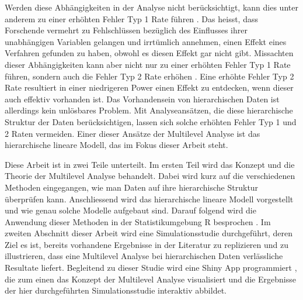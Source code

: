 \documentclass[12pt]{article}\usepackage[]{graphicx}\usepackage[]{color}
\begin{document}
Werden diese Abhängigkeiten in der Analyse nicht berücksichtigt, kann dies unter anderem zu einer erhöhten Fehler Typ 1 Rate führen \citep{dorman2008effect, mcneish2014analyzing}. Das heisst, dass Forschende vermehrt zu Fehlschlüssen bezüglich des Einflusses ihrer unabhängigen Variablen gelangen und irrtümlich annehmen, einen Effekt eines Verfahren gefunden zu haben, obwohl es diesen Effekt gar nicht gibt. Missachten dieser Abhängigkeiten kann aber nicht nur zu einer erhöhten Fehler Typ 1 Rate führen, sondern auch die Fehler Typ 2 Rate erhöhen \citep{MOERBEEK2003341}. Eine erhöhte Fehler Typ 2 Rate resultiert in einer niedrigeren Power einen Effekt zu entdecken, wenn dieser auch effektiv vorhanden ist. Das Vorhandensein von hierarchischen Daten ist allerdings kein unlösbares Problem. Mit Analyseansätzen, die diese hierarchische Struktur der Daten berücksichtigen, lassen sich solche erhöhten Fehler Typ 1 und 2 Raten vermeiden. Einer dieser Ansätze der Multilevel Analyse ist das hierarchische lineare Modell, das im Fokus dieser Arbeit steht.

Diese Arbeit ist in zwei Teile unterteilt. Im ersten Teil wird das Konzept und die Theorie der Multilevel Analyse behandelt. Dabei wird kurz auf die verschiedenen Methoden eingegangen, wie man Daten auf ihre hierarchische Struktur überprüfen kann. Anschliessend wird das hierarchische lineare Modell vorgestellt und wie genau solche Modelle aufgebaut sind. Darauf folgend wird die Anwendung dieser Methoden in der Statistikumgebung R besprochen \citep{R}. Im zweiten Abschnitt dieser Arbeit wird eine Simulationsstudie durchgeführt, deren Ziel es ist, bereits vorhandene Ergebnisse in der Literatur zu replizieren und zu illustrieren, dass eine Multilevel Analyse bei hierarchischen Daten verlässliche Resultate liefert. Begleitend zu dieser Studie wird eine Shiny App programmiert \citep{shiny}, die zum einen das Konzept der Multilevel Analyse visualisiert und die Ergebnisse der hier durchgeführten Simulationsstudie interaktiv abbildet.
\end{document}
